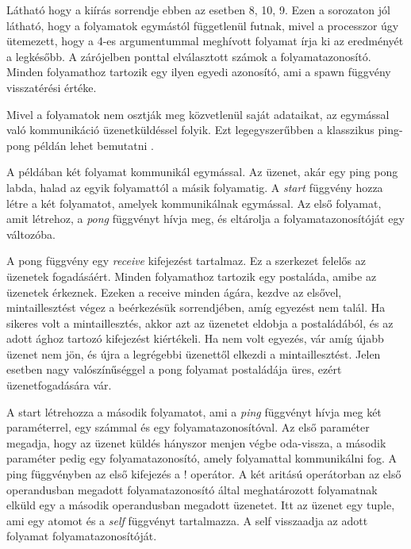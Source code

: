 

Látható hogy a kiírás sorrendje ebben az esetben 8, 10, 9. Ezen a sorozaton jól látható, hogy a folyamatok egymástól függetlenül futnak, mivel a processzor úgy ütemezett, hogy a 4-es argumentummal meghívott folyamat írja ki az eredményét a legkésőbb. A zárójelben ponttal elválasztott számok a folyamatazonosító. Minden folyamathoz tartozik egy ilyen egyedi azonosító, ami a spawn függvény visszatérési értéke.

Mivel a folyamatok nem osztják meg közvetlenül saját adataikat, az egymással való kommunikáció üzenetküldéssel folyik. Ezt legegyszerűbben a klasszikus ping-pong példán lehet bemutatni \cite{RefMan}.



A példában két folyamat kommunikál egymással. Az üzenet, akár egy ping pong labda, halad az egyik folyamattól a másik folyamatig. A \textit{start} függvény hozza létre a két folyamatot, amelyek kommunikálnak egymással. Az első folyamat, amit létrehoz, a \textit{pong} függvényt hívja meg, és eltárolja a folyamatazonosítóját egy változóba.

A pong függvény egy \textit{receive} kifejezést tartalmaz. Ez a szerkezet felelős az üzenetek fogadásáért. Minden folyamathoz tartozik egy postaláda, amibe az üzenetek érkeznek. Ezeken a receive minden ágára, kezdve az elsővel, mintaillesztést végez a beérkezésük sorrendjében, amíg egyezést nem talál. Ha sikeres volt a mintaillesztés, akkor azt az üzenetet eldobja a postaládából, és az adott ághoz tartozó kifejezést kiértékeli. Ha nem volt egyezés, vár amíg újabb üzenet nem jön, és újra a legrégebbi üzenettől elkezdi a mintaillesztést. Jelen esetben nagy valószínűséggel a pong folyamat postaládája üres, ezért üzenetfogadására vár.

A start létrehozza a második folyamatot, ami a \textit{ping} függvényt hívja meg két paraméterrel, egy számmal és egy folyamatazonosítóval. Az első paraméter megadja, hogy az üzenet küldés hányszor menjen végbe oda-vissza, a második paraméter pedig egy folyamatazonosító, amely folyamattal kommunikálni fog. A ping függvényben az első kifejezés a ! operátor. A két aritású operátorban az első operandusban megadott folyamatazonosító által meghatározott folyamatnak elküld egy a második operandusban megadott üzenetet. Itt az üzenet egy tuple, ami egy atomot és a \textit{self} függvényt tartalmazza. A self visszaadja az adott folyamat folyamatazonosítóját.

